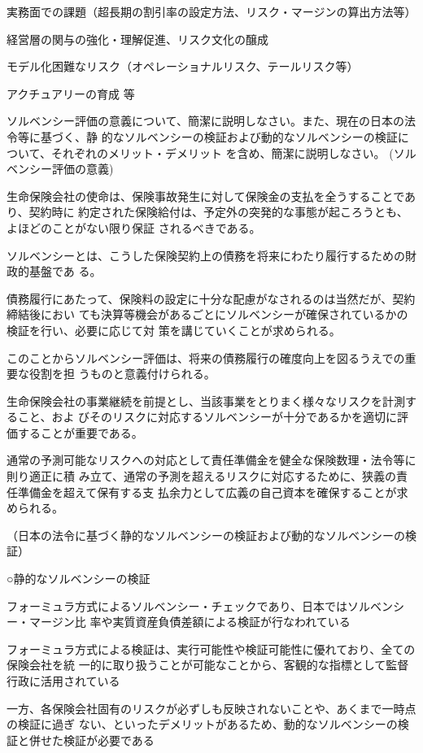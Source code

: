 \documentclass[report,gutter=10mm,fore-edge=10mm,uplatex,dvipdfmx]{jlreq}
\begin{document}
 実務面での課題（超長期の割引率の設定方法、リスク・マージンの算出方法等）

 経営層の関与の強化・理解促進、リスク文化の醸成

 モデル化困難なリスク（オペレーショナルリスク、テールリスク等）

 アクチュアリーの育成 等

ソルベンシー評価の意義について、簡潔に説明しなさい。また、現在の日本の法令等に基づく、静
的なソルベンシーの検証および動的なソルベンシーの検証について、それぞれのメリット・デメリット
を含め、簡潔に説明しなさい。
\answer{}
(ソルベンシー評価の意義)

 生命保険会社の使命は、保険事故発生に対して保険金の支払を全うすることであり、契約時に
約定された保険給付は、予定外の突発的な事態が起ころうとも、よほどのことがない限り保証
されるべきである。

 ソルベンシーとは、こうした保険契約上の債務を将来にわたり履行するための財政的基盤であ
る。

 債務履行にあたって、保険料の設定に十分な配慮がなされるのは当然だが、契約締結後におい
ても決算等機会があるごとにソルベンシーが確保されているかの検証を行い、必要に応じて対
策を講じていくことが求められる。

 このことからソルベンシー評価は、将来の債務履行の確度向上を図るうえでの重要な役割を担
うものと意義付けられる。

 生命保険会社の事業継続を前提とし、当該事業をとりまく様々なリスクを計測すること、およ
びそのリスクに対応するソルベンシーが十分であるかを適切に評価することが重要である。

 通常の予測可能なリスクへの対応として責任準備金を健全な保険数理・法令等に則り適正に積
み立て、通常の予測を超えるリスクに対応するために、狭義の責任準備金を超えて保有する支
払余力として広義の自己資本を確保することが求められる。


（日本の法令に基づく静的なソルベンシーの検証および動的なソルベンシーの検証）

○静的なソルベンシーの検証

 フォーミュラ方式によるソルベンシー・チェックであり、日本ではソルベンシー・マージン比
率や実質資産負債差額による検証が行なわれている

 フォーミュラ方式による検証は、実行可能性や検証可能性に優れており、全ての保険会社を統
一的に取り扱うことが可能なことから、客観的な指標として監督行政に活用されている

 一方、各保険会社固有のリスクが必ずしも反映されないことや、あくまで一時点の検証に過ぎ
ない、といったデメリットがあるため、動的なソルベンシーの検証と併せた検証が必要である
\end{document}
